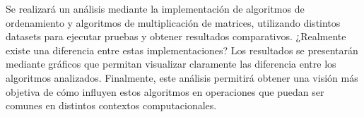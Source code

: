 Se realizará un análisis mediante la implementación de algoritmos de ordenamiento y algoritmos de multiplicación de matrices, utilizando distintos datasets para ejecutar pruebas y obtener resultados comparativos. ¿Realmente existe una diferencia entre estas implementaciones? Los resultados se presentarán mediante gráficos que permitan visualizar claramente las diferencia entre los algoritmos analizados. Finalmente, este análisis permitirá obtener una visión más objetiva de cómo influyen estos algoritmos en operaciones que puedan ser comunes en distintos contextos computacionales.
